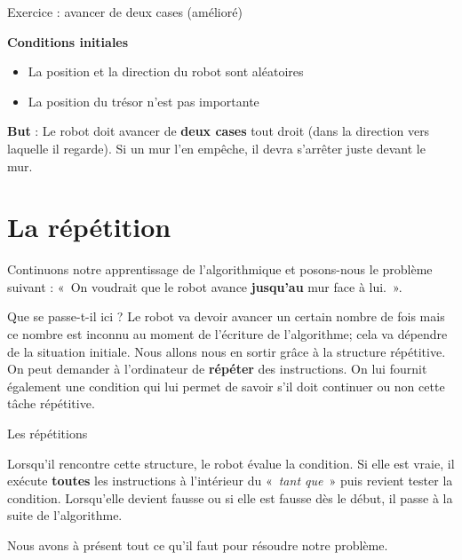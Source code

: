 	\begin{Emphase}{Exercice : avancer de deux cases (amélioré)}

		\textbf{Conditions initiales}

		\begin{itemize}
		\item La position et la direction du robot sont aléatoires
		\item La position du trésor n'est pas importante
		\end{itemize}
		
		\textbf{But} : Le robot doit avancer de \textbf{deux cases} tout droit
		(dans la direction vers laquelle il regarde). Si un mur
		l'en empêche, il devra s'arrêter
		juste devant le mur.

	\end{Emphase}

\section{La répétition}

	Continuons notre apprentissage de l'algorithmique et
	posons-nous le problème suivant : «~On voudrait que le robot avance
	\textbf{jusqu'au} mur face à lui.~».
	
	Que se passe-t-il ici ? Le robot va devoir avancer un certain nombre de
	fois mais ce nombre est inconnu au moment de
	l'écriture de l'algorithme; cela va
	dépendre de la situation initiale. Nous allons nous en sortir grâce à
	la structure répétitive. On peut demander à
	l'ordinateur de \textbf{répéter} des instructions. On
	lui fournit également une condition qui lui permet de savoir
	s'il doit continuer ou non cette tâche répétitive.

	\begin{Emphase}{Les répétitions}
	\end{Emphase}

	Lorsqu'il rencontre cette structure, le robot évalue la
	condition. Si elle est vraie, il exécute \textbf{toutes} les
	instructions à l'intérieur du «~\textit{tant que~}»
	puis revient tester la condition. Lorsqu'elle devient
	fausse ou si elle est fausse dès le début, il passe à la suite de
	l'algorithme.
	
	Nous avons à présent tout ce qu'il faut pour résoudre
	notre problème.


